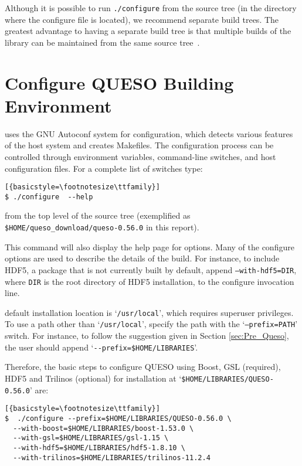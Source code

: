 Although it is possible to run \verb+./configure+ from the source tree (in the directory where the configure file is located), we recommend separate build trees. The greatest advantage to having a separate build tree is that multiple builds of the library
can be maintained from the same source tree~\cite{Trilinos}. 


\section{Configure QUESO Building Environment}\label{sec:Queso_configure}

\Queso{} uses the GNU Autoconf system for configuration, which detects various features of the host system and creates Makefiles. 
The configuration process can be controlled through environment variables, command-line switches, and host configuration files.
For a complete list of switches type:
\begin{lstlisting}[{basicstyle=\footnotesize\ttfamily}]
$ ./configure  --help  
\end{lstlisting}
%
from the top level of the source tree (exemplified as \verb+$HOME/queso_download/queso-0.56.0+ in this report). 

This command will also display the help page for \Queso{} options.  Many of the \Queso{} configure options are used to describe 
the details of the build. For instance, to include HDF5, a package that is not currently built by default, append \texttt{--with-hdf5=DIR}, 
where \texttt{DIR} is the root directory of HDF5 installation,  to the configure invocation line. 

\Queso{} default installation location is `\texttt{/usr/local}', which requires superuser privileges. To use a path
 other than `\texttt{/usr/local}', specify the path with the `\texttt{--prefix=PATH}' switch. For instance, to follow the suggestion
 given in Section \ref{sec:Pre_Queso}, the user should append `\verb+--prefix=$HOME/LIBRARIES+'.



Therefore, the basic steps to configure QUESO using Boost, GSL (required), HDF5 and Trilinos (optional) for installation at `\verb+$HOME/LIBRARIES/QUESO-0.56.0+' are:
\begin{lstlisting}[{basicstyle=\footnotesize\ttfamily}]
$  ./configure --prefix=$HOME/LIBRARIES/QUESO-0.56.0 \
  --with-boost=$HOME/LIBRARIES/boost-1.53.0 \
  --with-gsl=$HOME/LIBRARIES/gsl-1.15 \
  --with-hdf5=$HOME/LIBRARIES/hdf5-1.8.10 \
  --with-trilinos=$HOME/LIBRARIES/trilinos-11.2.4
  \end{lstlisting}

